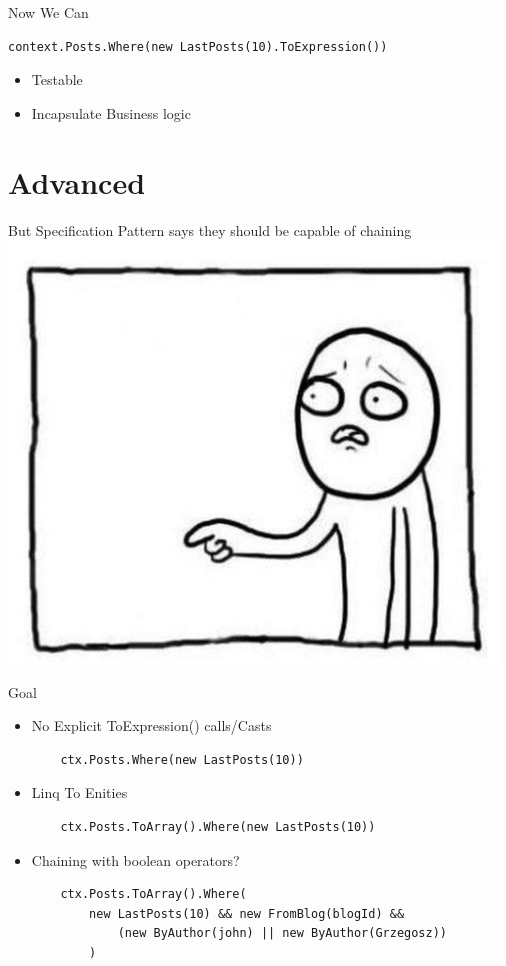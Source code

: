 \documentclass{bredelebeamer}
\begin{document}
\begin{frame}[fragile]{Now We Can}
    \begin{lstlisting}
context.Posts.Where(new LastPosts(10).ToExpression())
    \end{lstlisting}
    \begin{itemize}
        \item{Testable}
        \item{Incapsulate Business logic}
    \end{itemize}
\end{frame}
\section{Advanced}
\begin{frame}{But Specification Pattern says they should be capable of chaining}
    \includegraphics[scale=0.8]{images/But.png}
\end{frame}
\begin{frame}[fragile]{Goal}
    \begin{itemize}[<+->]
        \item {
            No Explicit ToExpression() calls/Casts
            \begin{lstlisting}
    ctx.Posts.Where(new LastPosts(10))
            \end{lstlisting}
        }
        \item {
            Linq To Enities
            \begin{lstlisting}
    ctx.Posts.ToArray().Where(new LastPosts(10))
            \end{lstlisting}
        }
        \item {
            Chaining with boolean operators?
            \begin{lstlisting}
    ctx.Posts.ToArray().Where(
        new LastPosts(10) && new FromBlog(blogId) &&
            (new ByAuthor(john) || new ByAuthor(Grzegosz))
        )
            \end{lstlisting}
        }
    \end{itemize}

\end{frame}
\end{document}

